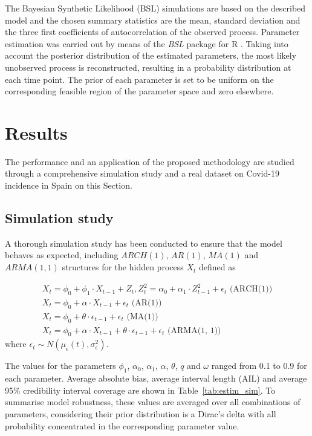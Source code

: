 \documentclass{article}
\begin{document}
The Bayesian Synthetic Likelihood (BSL) simulations are based on the described model and the chosen summary statistics are the mean, standard deviation and the three first coefficients of autocorrelation of the observed process. Parameter estimation was carried out by means of the \textit{BSL} \cite{BSLManual,An2019} package for R \cite{RCoreTeam2019}. Taking into account the posterior distribution of the estimated parameters, the most likely unobserved process is reconstructed, resulting in a probability distribution at each time point. The prior of each parameter is set to be uniform on the corresponding feasible region of the parameter space and zero elsewhere.

\section{Results}
\label{results}
The performance and an application of the proposed methodology are studied through a comprehensive simulation study and a real dataset on Covid-19 incidence in Spain on this Section.

\subsection{Simulation study}\label{sim}
A thorough simulation study has been conducted to ensure that the model behaves as expected, including $ARCH(1)$, $AR(1)$, $MA(1)$ and $ARMA(1, 1)$ structures for the hidden process $X_t$ defined as

\begin{equation}\begin{array}{c}
  X_t = \phi_0 + \phi_1 \cdot X_{t-1} + Z_t, Z^2_t=\alpha_0+\alpha_1 \cdot Z^2_{t-1} + \epsilon_t \text{ (ARCH(1))} \\
  X_t = \phi_0 + \alpha \cdot X_{t-1} + \epsilon_t \text{ (AR(1))} \\
  X_t = \phi_0 + \theta \cdot \epsilon_{t-1} + \epsilon_t \text{ (MA(1))} \\
  X_t = \phi_0 + \alpha \cdot X_{t-1} + \theta \cdot \epsilon_{t-1} + \epsilon_t \text{ (ARMA(1, 1))}
\end{array}\end{equation}
where $\epsilon_t \sim N(\mu_{\epsilon}(t), \sigma_{\epsilon}^2)$.

The values for the parameters $\phi_1$, $\alpha_0$, $\alpha_1$, $\alpha$, $\theta$, $q$ and $\omega$ ranged from 0.1 to 0.9 for each parameter. Average absolute bias, average interval length (AIL) and average 95\% credibility interval coverage are shown in Table~\ref{tab:estim_sim}. To summarise model robustness, these values are averaged over all combinations of parameters, considering their prior distribution is a Dirac's delta with all probability concentrated in the corresponding parameter value. 
\end{document}
